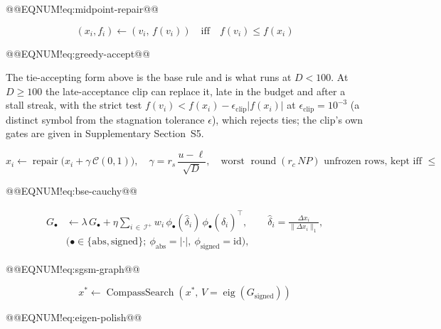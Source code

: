 \documentclass[10pt,a4paper]{article}
\begin{document}
@@EQNUM!eq:midpoint-repair@@








\[
(x_i, f_i) \leftarrow \left(v_i,\, f(v_i)\right)
\quad\text{iff}\quad f(v_i) \le f(x_i)
\]

@@EQNUM!eq:greedy-accept@@

The tie-accepting form above is the base rule and is what runs at $D<100$. At $D\ge100$ the late-acceptance clip can replace it, late in the budget and after a stall streak, with the strict test $f(v_i) < f(x_i) - \epsilon_{\mathrm{clip}}\lvert f(x_i)\rvert$ at $\epsilon_{\mathrm{clip}}=10^{-3}$ (a distinct symbol from the stagnation tolerance $\epsilon$), which rejects ties; the clip's own gates are given in Supplementary Section~S5.







\[
x_i \leftarrow \operatorname{repair}\!\bigl(x_i + \gamma\,\mathcal{C}(0,1)\bigr),
\quad \gamma = r_{s}\,\frac{u-\ell}{\sqrt{D}},
\quad\text{worst } \operatorname{round}(r_{c}\, NP)\text{ unfrozen rows, kept iff } \le
\]

@@EQNUM!eq:bse-cauchy@@














\[
\begin{aligned}
G_{\bullet} &\leftarrow \lambda\,G_{\bullet} +
\eta \sum_{i\,\in\,\mathcal{I}^{+}} w_i\, \phi_{\bullet}(\hat{\delta}_i)\, \phi_{\bullet}(\hat{\delta}_i)^{\!\top},
\qquad \hat{\delta}_i = \frac{\Delta x_i}{\lVert \Delta x_i\rVert_1},\\[2pt]
&\bigl(\bullet\in\{\mathrm{abs},\mathrm{signed}\};\ \phi_{\mathrm{abs}}{=}|\cdot|,\ \phi_{\mathrm{signed}}{=}\mathrm{id}\bigr),
\end{aligned}
\]

@@EQNUM!eq:sgsm-graph@@






\[
x^{*} \leftarrow \operatorname{CompassSearch}\!\left(x^{*},\,
V = \operatorname{eig}(G_{\mathrm{signed}})\right)
\]

@@EQNUM!eq:eigen-polish@@
\end{document}
